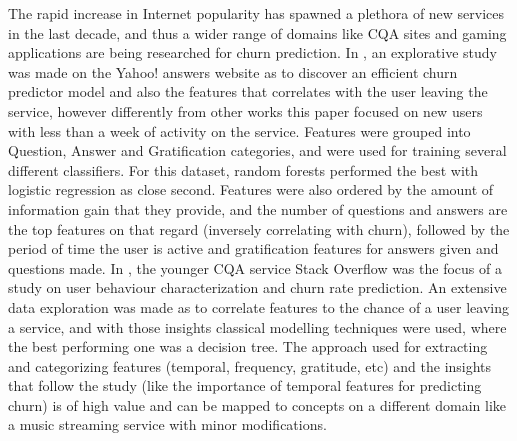 \documentclass{kththesis}
\begin{document}
The rapid increase in Internet popularity has spawned a plethora of new services in the last decade, and thus a wider range of domains like CQA sites and gaming applications are being researched for churn prediction. In \citep{Dror2012}, an explorative study was made on the Yahoo! answers website as to discover an efficient churn predictor model and also the features that correlates with the user leaving the service, however differently from other works this paper focused on new users with less than a week of activity on the service. Features were grouped into Question, Answer and Gratification categories, and were used for training several different classifiers. For this dataset, random forests performed the best with logistic regression as close second. Features were also ordered by the amount of information gain that they provide, and the number of questions and answers are the top features on that regard (inversely correlating with churn), followed by the period of time the user is active and gratification features for answers given and questions made. In \citep{Pudipeddi2014}, the younger CQA service Stack Overflow was the focus of a study on user behaviour characterization and churn rate prediction. An extensive data exploration was made as to correlate features to the chance of a user leaving a service, and with those insights classical modelling techniques were used, where the best performing one was a decision tree. The approach used for extracting and categorizing features (temporal, frequency, gratitude, etc) and the insights that follow the study (like the importance of temporal features for predicting churn) is of high value and can be mapped to concepts on a different domain like a music streaming service with minor modifications. 
\end{document}
